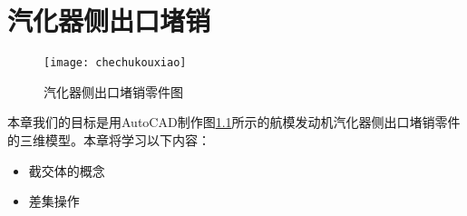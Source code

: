 \chapter{汽化器侧出口堵销}
\begin{figure}[htbp]
\centering
\texttt{[image: chechukouxiao]}
\caption{汽化器侧出口堵销零件图}\label{fig:chechukouxiao}
\end{figure}
本章我们的目标是用AutoCAD制作图\ref{fig:chechukouxiao}所示的航模发动机汽化器侧出口堵销零件的三维模型。本章将学习以下内容：
\begin{itemize}
	\item 截交体的概念
	\item 差集操作
\end{itemize}
